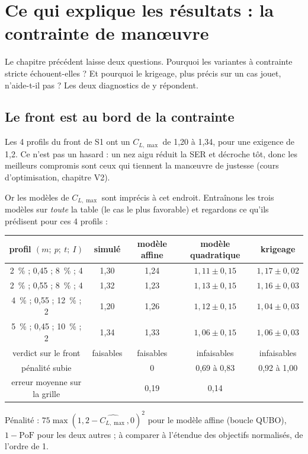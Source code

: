 \chapter{Ce qui explique les résultats : la contrainte de manœuvre}\label{ch:diagnostic}

Le chapitre précédent laisse deux questions. Pourquoi les variantes à contrainte stricte échouent-elles ? Et pourquoi le krigeage, plus précis sur un cas jouet, n'aide-t-il pas ? Les deux diagnostics de  y répondent.

\section{Le front est au bord de la contrainte}
Les 4 profils du front de S1 ont un $C_{L,\max}$ de 1,20 à 1,34, pour une exigence de 1,2. Ce n'est pas un hasard : un nez aigu réduit la SER et décroche tôt, donc les meilleurs compromis sont ceux qui tiennent la manœuvre de justesse (cours d'optimisation, chapitre V2).

Or les modèles de $C_{L,\max}$ sont imprécis à cet endroit. Entraînons les trois modèles sur \emph{toute} la table (le cas le plus favorable) et regardons ce qu'ils prédisent pour ces 4 profils :
\begin{center}
\renewcommand{\arraystretch}{1.15}
\begin{tabular}{ccccc}
\toprule
profil $(m;\ p;\ t;\ I)$ & simulé & modèle affine & modèle quadratique & krigeage \\
\midrule
2~\% ; 0,45 ; 8~\% ; 4 & 1,30 & 1,24 & $1{,}11\pm0{,}15$ & $1{,}17\pm0{,}02$ \\
2~\% ; 0,55 ; 8~\% ; 4 & 1,32 & 1,23 & $1{,}13\pm0{,}15$ & $1{,}16\pm0{,}03$ \\
4~\% ; 0,55 ; 12~\% ; 2 & 1,20 & 1,26 & $1{,}12\pm0{,}15$ & $1{,}04\pm0{,}03$ \\
5~\% ; 0,45 ; 10~\% ; 2 & 1,34 & 1,33 & $1{,}06\pm0{,}15$ & $1{,}06\pm0{,}03$ \\
\midrule
verdict sur le front & faisables & faisables & infaisables & infaisables \\
pénalité subie & & 0 & 0,69 à 0,83 & 0,92 à 1,00 \\
erreur moyenne sur la grille & & 0,19 & 0,14 & \\
\bottomrule
\end{tabular}

\smallskip
{\footnotesize Pénalité : $75\max(1{,}2-\widehat{C_{L,\max}},0)^2$ pour le modèle affine (boucle QUBO), $1-\mathrm{PoF}$ pour les deux autres ; à comparer à l'étendue des objectifs normalisés, de l'ordre de 1.}
\end{center}

